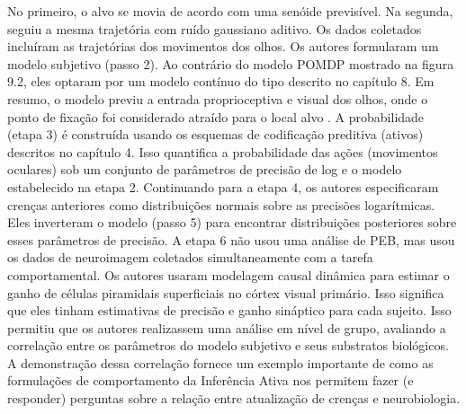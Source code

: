\documentclass[
  12pt,
]{book}
\begin{document}
No primeiro, o alvo se movia de acordo com uma senóide previsível. Na segunda, seguiu a mesma trajetória com ruído gaussiano aditivo. Os dados coletados incluíram as trajetórias dos movimentos dos olhos. Os autores formularam um modelo subjetivo (passo 2). Ao contrário do modelo POMDP mostrado na figura 9.2, eles optaram por um modelo contínuo do tipo descrito no capítulo 8. Em resumo, o modelo previu a entrada proprioceptiva e visual dos olhos, onde o ponto de fixação foi considerado atraído para o local alvo . A probabilidade (etapa 3) é construída usando os esquemas de codificação preditiva (ativos) descritos no capítulo 4. Isso quantifica a probabilidade das ações (movimentos oculares) sob um conjunto de parâmetros de precisão de log e o modelo estabelecido na etapa 2. Continuando para a etapa 4, os autores especificaram crenças anteriores como distribuições normais sobre as precisões logarítmicas. Eles inverteram o modelo (passo 5) para encontrar distribuições posteriores sobre esses parâmetros de precisão. A etapa 6 não usou uma análise de PEB, mas usou os dados de neuroimagem coletados simultaneamente com a tarefa comportamental. Os autores usaram modelagem causal dinâmica para estimar o ganho de células piramidais superficiais no córtex visual primário. Isso significa que eles tinham estimativas de precisão e ganho sináptico para cada sujeito. Isso permitiu que os autores realizassem uma análise em nível de grupo, avaliando a correlação entre os parâmetros do modelo subjetivo e seus substratos biológicos. A demonstração dessa correlação fornece um exemplo importante de como as formulações de comportamento da Inferência Ativa nos permitem fazer (e responder) perguntas sobre a relação entre atualização de crenças e neurobiologia.
\end{document}

